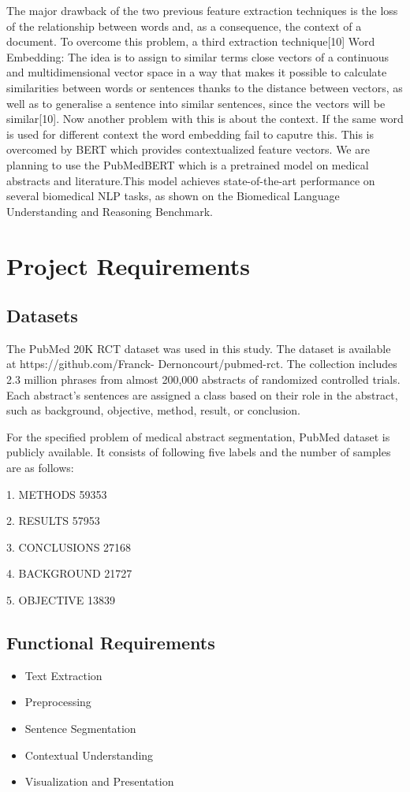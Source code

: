 \documentclass[12pt,a4paper]{report}     %
\begin{document}
\begin{normalsize}
{\break
\break
The major drawback of the two previous feature extraction techniques is the loss of the
relationship between words and, as a consequence, the context of a document. To overcome this problem,  a third extraction technique[10]
Word Embedding: The idea is to assign to similar terms close vectors of a continuous
and multidimensional vector space in a way that makes it possible to calculate similarities
between words or sentences thanks to the distance between vectors, as well as to
generalise a sentence into similar sentences, since the vectors will be similar[10].
Now another problem with this is about the context. If the same word is used for different context the word embedding fail to caputre this. 
This is overcomed by BERT which provides contextualized feature vectors.
We are planning to use the PubMedBERT which is a pretrained model on medical abstracts and literature.This model achieves state-of-the-art performance on several biomedical NLP tasks, as shown on the Biomedical Language Understanding and Reasoning Benchmark.
\\
\newpage
\section{Project Requirements}

\subsection{Datasets}
The PubMed 20K RCT dataset was used in this study. The dataset is available at https://github.com/Franck- Dernoncourt/pubmed-rct.
The collection includes 2.3 million phrases from almost 200,000 abstracts of randomized controlled trials. Each abstract's sentences are assigned a class based on their role in the abstract, such as background, objective, method, result, or conclusion.


For the specified problem of medical abstract segmentation, PubMed dataset is publicly available. It consists of following five labels and the number of samples are as follows:

1. METHODS          59353

2. RESULTS          57953

3. CONCLUSIONS      27168

4. BACKGROUND       21727

5. OBJECTIVE        13839
\subsection{Functional Requirements}
\begin{itemize}
    \item Text Extraction
    \item Preprocessing
    \item Sentence Segmentation 
    \item Contextual Understanding
    \item Visualization and Presentation
\end{itemize}
}
\end{normalsize}
\end{document}
